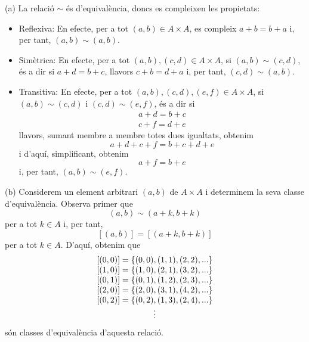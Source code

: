 \begin{solucio}
(a) La relació $\sim $ és d'equivalència, doncs es compleixen
les propietats:

\begin{itemize}
\item Reflexiva: En efecte, per a tot $(a,b)\in A\times A$, es compleix $%
a+b=b+a$ i, per tant, $(a,b)\sim (a,b)$.

\item Simètrica: En efecte, per a tot $(a,b),(c,d)\in A\times A$, si $%
(a,b)\sim (c,d)$, és a dir si $a+d=b+c$, llavors $c+b=d+a$ i, per tant, $%
(c,d)\sim (a,b)$.

\item Transitiva: En efecte, per a tot $(a,b),(c,d),(e,f)\in A\times A$, si $%
(a,b)\sim (c,d)$ i $(c,d)\sim (e,f)$, és a dir si%
\begin{equation*}
\begin{array}{c}
a+d=b+c \\
c+f=d+e%
\end{array}%
\end{equation*}%
llavors, sumant membre a membre totes dues igualtats, obtenim%
\begin{equation*}
a+d+c+f=b+c+d+e
\end{equation*}%
i d'aquí, simplificant, obtenim%
\begin{equation*}
a+f=b+e
\end{equation*}%
i, per tant, $(a,b)\sim (e,f)$.
\end{itemize}

(b) Considerem un element arbitrari $(a,b)$ de $A\times A$ i determinem la
seva classe d'equivalència. Observa primer que%
\begin{equation*}
(a,b)\sim (a+k,b+k)
\end{equation*}%
per a tot $k\in A$ i, per tant,%
\begin{equation*}
\left[ (a,b)\right] =\left[ (a+k,b+k)\right]
\end{equation*}%
per a tot $k\in A$. D'aquí, obtenim que%
\begin{equation*}
\begin{array}{l}
\left[ (0,0)\right] =\left\{ (0,0),(1,1),(2,2),...\right\} \\
\left[ (1,0)\right] =\left\{ (1,0),(2,1),(3,2),...\right\} \\
\left[ (0,1)\right] =\left\{ (0,1),(1,2),(2,3),...\right\} \\
\left[ (2,0)\right] =\left\{ (2,0),(3,1),(4,2),...\right\} \\
\left[ (0,2)\right] =\left\{ (0,2),(1,3),(2,4),...\right\} \\
\multicolumn{1}{c}{\vdots}%
\end{array}%
\end{equation*}%
són classes d'equivalència d'aquesta relació.


\end{solucio}
